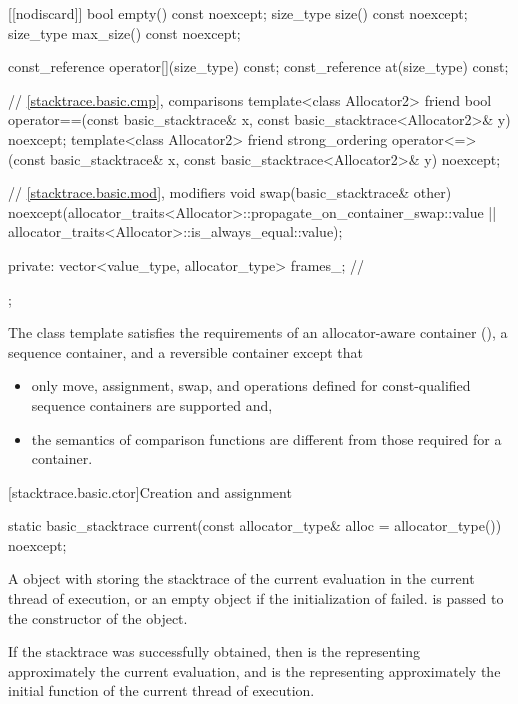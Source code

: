 \begin{codeblock}
{{    [[nodiscard]] bool empty() const noexcept;
    size_type size() const noexcept;
    size_type max_size() const noexcept;

    const_reference operator[](size_type) const;
    const_reference at(size_type) const;

    // \ref{stacktrace.basic.cmp}, comparisons
    template<class Allocator2>
    friend bool operator==(const basic_stacktrace& x,
                           const basic_stacktrace<Allocator2>& y) noexcept;
    template<class Allocator2>
    friend strong_ordering operator<=>(const basic_stacktrace& x,
                                       const basic_stacktrace<Allocator2>& y) noexcept;

    // \ref{stacktrace.basic.mod}, modifiers
    void swap(basic_stacktrace& other)
      noexcept(allocator_traits<Allocator>::propagate_on_container_swap::value ||
        allocator_traits<Allocator>::is_always_equal::value);

  private:
    vector<value_type, allocator_type> frames_;         // \expos
  };
}
\end{codeblock}

\pnum
The class template  satisfies
the requirements of
an allocator-aware container (),
a sequence container, and
a reversible container
except that
\begin{itemize}
\item
only move, assignment, swap, and
operations defined for const-qualified sequence containers are supported and,
\item
the semantics of comparison functions
are different from those required for a container.
\end{itemize}

[stacktrace.basic.ctor]{Creation and assignment}

%
\begin{itemdecl}
static basic_stacktrace current(const allocator_type& alloc = allocator_type()) noexcept;
\end{itemdecl}

\begin{itemdescr}
\pnum
\returns
A  object
with  storing
the stacktrace of the current evaluation in the current thread of execution, or
an empty  object
if the initialization of  failed.
 is passed to the constructor of the  object.

\begin{note}
If the stacktrace was successfully obtained,
then  is the 
representing approximately the current evaluation, and
 is the 
representing approximately the initial function of
the current thread of execution.
\end{note}
\end{itemdescr}

